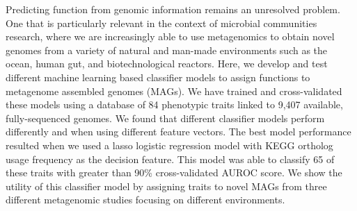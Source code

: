 \documentclass[10pt,letterpaper]{article}
\begin{document}
Predicting function from genomic information remains an unresolved problem. One that is particularly relevant in the context of microbial communities research, where we are increasingly able to use metagenomics to obtain novel genomes from a variety of natural and man-made environments such as the ocean, human gut, and biotechnological reactors. Here, we develop and test different machine learning based classifier models to assign functions to metagenome assembled genomes (MAGs). We have trained and cross-validated these models using a database of 84 phenotypic traits linked to 9,407 available, fully-sequenced genomes. We found that different classifier models perform differently and when using different feature vectors. The best model performance resulted when we used a lasso logistic regression model with KEGG ortholog usage frequency as the decision feature. This model was able to classify 65 of these traits with greater than 90\% cross-validated AUROC score. We show the utility of this classifier model by assigning traits to novel MAGs from three different metagenomic studies focusing on different environments.


\linenumbers

\end{document}
